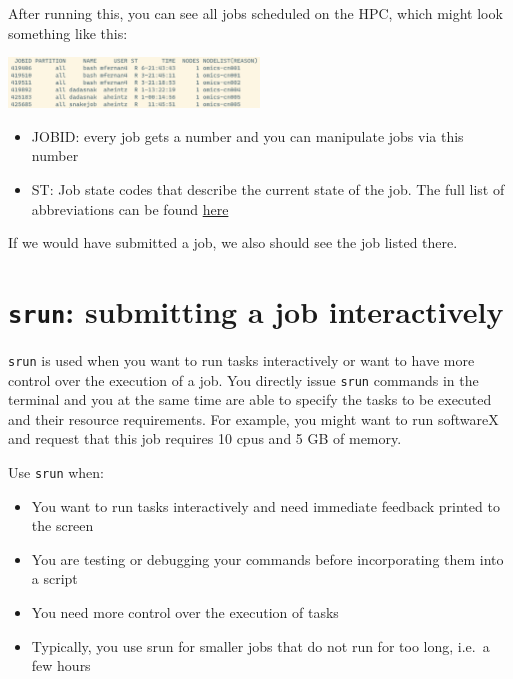 \documentclass[
  letterpaper,
  DIV=11,
  numbers=noendperiod]{scrreprt}
\providecommand{\tightlist}{%
  \setlength{\itemsep}{0pt}\setlength{\parskip}{0pt}}\usepackage{longtable,booktabs,array}
\begin{document}
After running this, you can see all jobs scheduled on the HPC, which
might look something like this:

\begin{center}
\includegraphics[width=0.5\textwidth,height=\textheight]{../img/squeue.png}
\end{center}

\begin{itemize}
\tightlist
\item
  JOBID: every job gets a number and you can manipulate jobs via this
  number
\item
  ST: Job state codes that describe the current state of the job. The
  full list of abbreviations can be found
  \href{https://curc.readthedocs.io/en/latest/running-jobs/squeue-status-codes.html}{here}
\end{itemize}

If we would have submitted a job, we also should see the job listed
there.

\section{\texorpdfstring{\texttt{srun}: submitting a job
interactively}{srun: submitting a job interactively}}\label{srun-submitting-a-job-interactively}

\texttt{srun} is used when you want to run tasks interactively or want
to have more control over the execution of a job. You directly issue
\texttt{srun} commands in the terminal and you at the same time are able
to specify the tasks to be executed and their resource requirements. For
example, you might want to run softwareX and request that this job
requires 10 cpus and 5 GB of memory.

Use \texttt{srun} when:

\begin{itemize}
\tightlist
\item
  You want to run tasks interactively and need immediate feedback
  printed to the screen
\item
  You are testing or debugging your commands before incorporating them
  into a script
\item
  You need more control over the execution of tasks
\item
  Typically, you use srun for smaller jobs that do not run for too long,
  i.e.~a few hours
\end{itemize}
\end{document}
